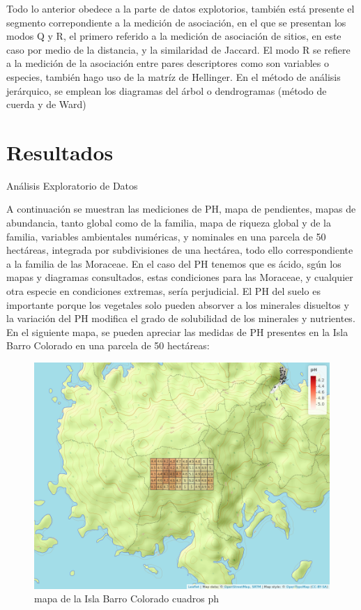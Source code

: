\documentclass[11pt,]{article}
\begin{document}
Todo lo anterior obedece a la parte de datos explotorios, también está
presente el segmento correpondiente a la medición de asociación, en el
que se presentan los modos Q y R, el primero referido a la medición de
asociación de sitios, en este caso por medio de la distancia, y la
similaridad de Jaccard. El modo R se refiere a la medición de la
asociación entre pares descriptores como son variables o especies,
también hago uso de la matríz de Hellinger. En el método de análisis
jerárquico, se emplean los diagramas del árbol o dendrogramas (método de
cuerda y de Ward)

\section{Resultados}\label{resultados}

Análisis Exploratorio de Datos

A continuación se muestran las mediciones de PH, mapa de pendientes,
mapas de abundancia, tanto global como de la familia, mapa de riqueza
global y de la familia, variables ambientales numéricas, y nominales en
una parcela de 50 hectáreas, integrada por subdivisiones de una
hectárea, todo ello correspondiente a la familia de las Moraceae. En el
caso del PH tenemos que es ácido, sgún los mapas y diagramas
consultados, estas condiciones para las Moraceae, y cualquier otra
especie en condiciones extremas, sería perjudicial. El PH del suelo es
importante porque los vegetales solo pueden absorver a los minerales
disueltos y la variación del PH modifica el grado de solubilidad de los
minerales y nutrientes. En el siguiente mapa, se pueden apreciar las
medidas de PH presentes en la Isla Barro Colorado en una parcela de 50
hectáreas:

\begin{figure}
\centering
\includegraphics[width=1.00000\textwidth]{mapa_cuadros_ph.png}
\caption{mapa de la Isla Barro Colorado cuadros ph\label{fig:bci_map}}
\end{figure}
\end{document}
